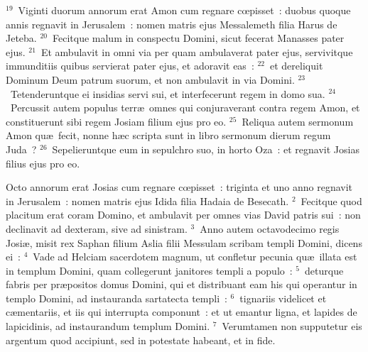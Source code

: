 ${}^{19}$~Viginti duorum annorum erat Amon cum regnare cœpisset~: duobus quoque annis regnavit in Jerusalem~: nomen matris ejus Messalemeth filia Harus de Jeteba.
${}^{20}$~Fecitque malum in conspectu Domini, sicut fecerat Manasses pater ejus.
${}^{21}$~Et ambulavit in omni via per quam ambulaverat pater ejus, servivitque immunditiis quibus servierat pater ejus, et adoravit eas~:
${}^{22}$~et dereliquit Dominum Deum patrum suorum, et non ambulavit in via Domini.
${}^{23}$~Tetenderuntque ei insidias servi sui, et interfecerunt regem in domo sua.
${}^{24}$~Percussit autem populus terr\ae\ omnes qui conjuraverant contra regem Amon, et constituerunt sibi regem Josiam filium ejus pro eo.
${}^{25}$~Reliqua autem sermonum Amon qu\ae\ fecit, nonne h\ae c scripta sunt in libro sermonum dierum regum Juda~?
${}^{26}$~Sepelieruntque eum in sepulchro suo, in horto Oza~: et regnavit Josias filius ejus pro eo.

\bchapter
\lettrine[lines=3,image=true,loversize=0.05,lraise=-0.03]{O}{}cto annorum erat Josias cum regnare cœpisset~: triginta et uno anno regnavit in Jerusalem~: nomen matris ejus Idida filia Hadaia de Besecath.
${}^{2}$~Fecitque quod placitum erat coram Domino, et ambulavit per omnes vias David patris sui~: non declinavit ad dexteram, sive ad sinistram.
${}^{3}$~Anno autem octavodecimo regis Josi\ae , misit rex Saphan filium Aslia filii Messulam scribam templi Domini, dicens ei~:
${}^{4}$~Vade ad Helciam sacerdotem magnum, ut confletur pecunia qu\ae\ illata est in templum Domini, quam collegerunt janitores templi a populo~:
${}^{5}$~deturque fabris per pr\ae positos domus Domini, qui et distribuant eam his qui operantur in templo Domini, ad instauranda sartatecta templi~:
${}^{6}$~tignariis videlicet et c\ae mentariis, et iis qui interrupta componunt~: et ut emantur ligna, et lapides de lapicidinis, ad instaurandum templum Domini.
${}^{7}$~Verumtamen non supputetur eis argentum quod accipiunt, sed in potestate habeant, et in fide.



